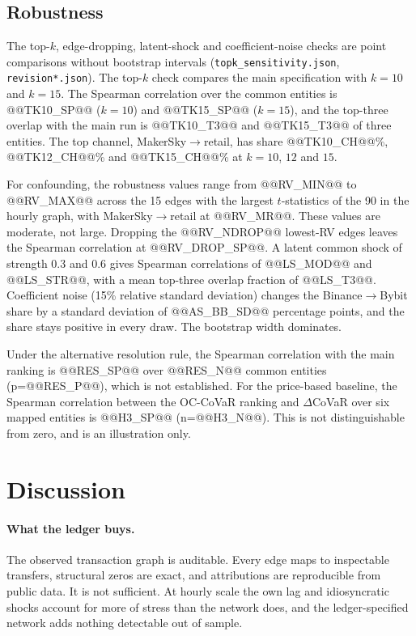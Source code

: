 \documentclass[referee,pdflatex,sn-mathphys-ay]{sn-jnl}
\theoremstyle{thmstyleone}%
\theoremstyle{thmstyletwo}%
\theoremstyle{thmstylethree}%
\begin{document}
\subsection{Robustness}
\label{subsec:robustness}
The top-$k$, edge-dropping, latent-shock and coefficient-noise checks are point comparisons without bootstrap intervals
(\texttt{topk\_sensitivity.json}, \texttt{revision*.json}). The top-$k$ check compares the main specification with $k=10$ and $k=15$. The Spearman correlation over the common entities is
@@TK10_SP@@ ($k=10$) and @@TK15_SP@@ ($k=15$), and the top-three overlap with the main run is @@TK10_T3@@ and @@TK15_T3@@ of three entities. The top channel,
MakerSky$\to$retail, has share @@TK10_CH@@\%, @@TK12_CH@@\% and @@TK15_CH@@\% at $k=10$, $12$ and $15$.

For confounding, the robustness values range from @@RV_MIN@@ to @@RV_MAX@@ across the 15 edges with the largest $t$-statistics of the 90 in the hourly graph, with
MakerSky$\to$retail at @@RV_MR@@. These values are moderate, not large. Dropping the @@RV_NDROP@@ lowest-RV edges leaves the Spearman
correlation at @@RV_DROP_SP@@. A latent common shock of strength 0.3 and 0.6 gives Spearman correlations of @@LS_MOD@@ and @@LS_STR@@,
with a mean top-three overlap fraction of @@LS_T3@@. Coefficient noise (15\% relative standard deviation) changes the Binance$\to$Bybit share
by a standard deviation of @@AS_BB_SD@@ percentage points, and the share stays positive in every draw. The bootstrap width dominates.

Under the alternative resolution rule, the Spearman correlation with the main ranking is @@RES_SP@@ over @@RES_N@@ common entities
(p=@@RES_P@@), which is not established. For the price-based baseline, the Spearman correlation between the OC-CoVaR ranking and
$\Delta$CoVaR over six mapped entities is @@H3_SP@@ (n=@@H3_N@@). This is not distinguishable from zero, and is an illustration only.

\section{Discussion}
\label{sec:discussion}

\paragraph{What the ledger buys.} The observed transaction graph is auditable. Every edge maps to inspectable transfers, structural
zeros are exact, and attributions are reproducible from public data. It is not sufficient. At hourly scale the own lag and idiosyncratic
shocks account for more of stress than the network does, and the ledger-specified network adds nothing detectable out of sample.
\end{document}
